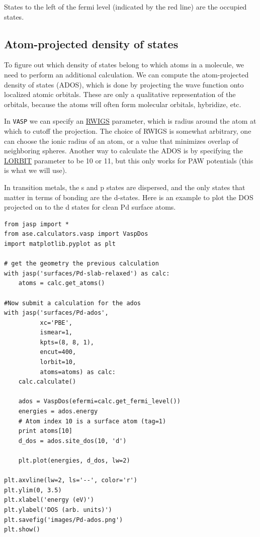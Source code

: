\documentclass[11pt]{article}
\begin{document}
States to the left of the fermi level (indicated by the red line) are the occupied states.


\subsection{Atom-projected density of states}
\label{sec-4-2}

To figure out which density of states belong to which atoms in a molecule, we need to perform an additional calculation. We can compute the atom-projected density of states (ADOS), which is done by projecting the wave function onto localized atomic orbitals. These are only a qualitative representation of the orbitals, because the atoms will often form molecular orbitals, hybridize, etc. 

In \texttt{VASP} we can specify an \href{http://cms.mpi.univie.ac.at/wiki/index.php/RWIGS}{RWIGS} parameter, which is radius around the atom at which to cutoff the projection. The choice of RWIGS is somewhat arbitrary, one can choose the ionic radius of an atom, or a value that minimizes overlap of neighboring spheres. Another way to calculate the ADOS is by specifying the \href{http://cms.mpi.univie.ac.at/vasp/vasp/LORBIT.html}{LORBIT} parameter to be 10 or 11, but this only works for PAW potentials (this is what we will use).

In transition metals, the s and p states are dispersed, and the only states that matter in terms of bonding are the d-states. Here is an example to plot the DOS projected on to the d states for clean Pd surface atoms.

\begin{verbatim}
from jasp import *
from ase.calculators.vasp import VaspDos
import matplotlib.pyplot as plt

# get the geometry the previous calculation
with jasp('surfaces/Pd-slab-relaxed') as calc:
    atoms = calc.get_atoms()

#Now submit a calculation for the ados
with jasp('surfaces/Pd-ados',
          xc='PBE',
          ismear=1,
          kpts=(8, 8, 1),
          encut=400,
          lorbit=10,
          atoms=atoms) as calc:
    calc.calculate()

    ados = VaspDos(efermi=calc.get_fermi_level())
    energies = ados.energy
    # Atom index 10 is a surface atom (tag=1)
    print atoms[10]
    d_dos = ados.site_dos(10, 'd')

    plt.plot(energies, d_dos, lw=2)

plt.axvline(lw=2, ls='--', color='r')
plt.ylim(0, 3.5)
plt.xlabel('energy (eV)')
plt.ylabel('DOS (arb. units)')
plt.savefig('images/Pd-ados.png')
plt.show()
\end{verbatim}
\end{document}
